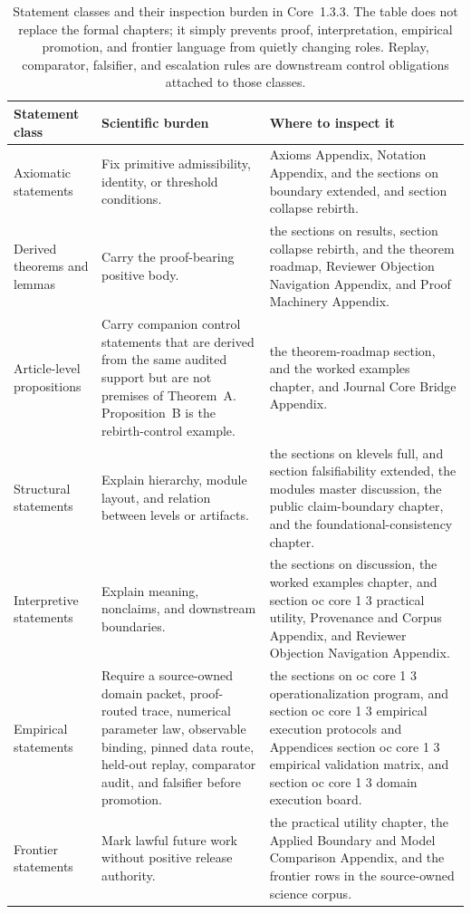 \begin{table}[htbp]
\centering
\begingroup
\footnotesize
\RaggedRight
\setlength{\tabcolsep}{4pt}
\begin{tabular}{@{}L{0.21\textwidth}L{0.28\textwidth}L{0.39\textwidth}@{}}
\toprule
\textbf{Statement class} & \textbf{Scientific burden} & \textbf{Where to inspect it} \\
\midrule
Axiomatic statements & Fix primitive admissibility, identity, or threshold conditions. & Axioms Appendix, Notation Appendix, and the sections on boundary extended, and section collapse rebirth. \\
Derived theorems and lemmas & Carry the proof-bearing positive body. & the sections on results, section collapse rebirth, and the theorem roadmap, Reviewer Objection Navigation Appendix, and Proof Machinery Appendix. \\
Article-level propositions & Carry companion control statements that are derived from the same audited support but are not premises of Theorem~A. Proposition~B is the rebirth-control example. & the theorem-roadmap section, and the worked examples chapter, and Journal Core Bridge Appendix. \\
Structural statements & Explain hierarchy, module layout, and relation between levels or artifacts. & the sections on klevels full, and section falsifiability extended, the modules master discussion, the public claim-boundary chapter, and the foundational-consistency chapter. \\
Interpretive statements & Explain meaning, nonclaims, and downstream boundaries. & the sections on discussion, the worked examples chapter, and section oc core 1 3 practical utility, Provenance and Corpus Appendix, and Reviewer Objection Navigation Appendix. \\
Empirical statements & Require a source-owned domain packet, proof-routed trace, numerical parameter law, observable binding, pinned data route, held-out replay, comparator audit, and falsifier before promotion. & the sections on oc core 1 3 operationalization program, and section oc core 1 3 empirical execution protocols and Appendices section oc core 1 3 empirical validation matrix, and section oc core 1 3 domain execution board. \\
Frontier statements & Mark lawful future work without positive release authority. & the practical utility chapter, the Applied Boundary and Model Comparison Appendix, and the frontier rows in the source-owned science corpus. \\
\bottomrule
\end{tabular}
\endgroup
\caption{Statement classes and their inspection burden in Core~1.3.3. The table
does not replace the formal chapters; it simply prevents proof, interpretation,
empirical promotion, and frontier language from quietly changing roles. Replay,
comparator, falsifier, and escalation rules are downstream control obligations
attached to those classes.}
\label{tab:oc13-statement-classes}
\end{table}


